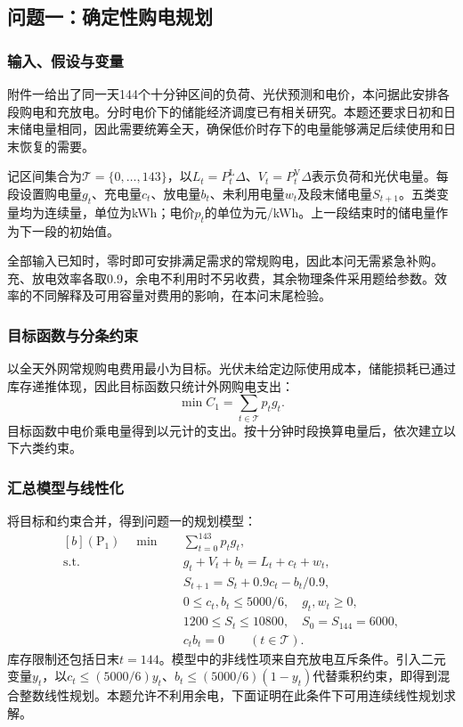 \subsection{问题一：确定性购电规划}\label{sec:q1}
\subsubsection{输入、假设与变量}
附件一给出了同一天144个十分钟区间的负荷、光伏预测和电价，本问据此安排各段购电和充放电。分时电价下的储能经济调度已有相关研究。本题还要求日初和日末储电量相同，因此需要统筹全天，确保低价时存下的电量能够满足后续使用和日末恢复的需要。

记区间集合为$\mathcal T=\{0,\ldots,143\}$，以$L_t=P_t^{\mathrm L}\Delta$、$V_t=P_t^{\mathrm V}\Delta$表示负荷和光伏电量。每段设置购电量$g_t$、充电量$c_t$、放电量$b_t$、未利用电量$w_t$及段末储电量$S_{t+1}$。五类变量均为连续量，单位为kWh；电价$p_t$的单位为元/kWh。上一段结束时的储电量作为下一段的初始值。

全部输入已知时，零时即可安排满足需求的常规购电，因此本问无需紧急补购。充、放电效率各取0.9，余电不利用时不另收费，其余物理条件采用题给参数。效率的不同解释及可用容量对费用的影响，在本问末尾检验。

\subsubsection{目标函数与分条约束}
以全天外网常规购电费用最小为目标。光伏未给定边际使用成本，储能损耗已通过库存递推体现，因此目标函数只统计外网购电支出：
\begin{equation}
 \min C_1=\sum_{t\in\mathcal T}p_tg_t.\label{eq:q1-objective}
\end{equation}
目标函数中电价乘电量得到以元计的支出。按十分钟时段换算电量后，依次建立以下六类约束。



\subsubsection{汇总模型与线性化}
将目标和约束合并，得到问题一的规划模型：
\begin{equation}
\begin{aligned}[b]
 (\mathrm P_1)\quad \min\quad&\sum_{t=0}^{143}p_tg_t,\\
 \mathrm{s.t.}\quad&g_t+V_t+b_t=L_t+c_t+w_t,\\
 &S_{t+1}=S_t+0.9c_t-b_t/0.9,\\
 &0\le c_t,b_t\le5000/6,\quad g_t,w_t\ge0,\\
 &1200\le S_t\le10800,\quad S_0=S_{144}=6000,\\
 &c_tb_t=0\qquad(t\in\mathcal T).
\end{aligned}\label{eq:q1-summary}
\end{equation}
库存限制还包括日末$t=144$。模型中的非线性项来自充放电互斥条件。引入二元变量$y_t$，以$c_t\le(5000/6)y_t$、$b_t\le(5000/6)(1-y_t)$代替乘积约束，即得到混合整数线性规划。本题允许不利用余电，下面证明在此条件下可用连续线性规划求解。

